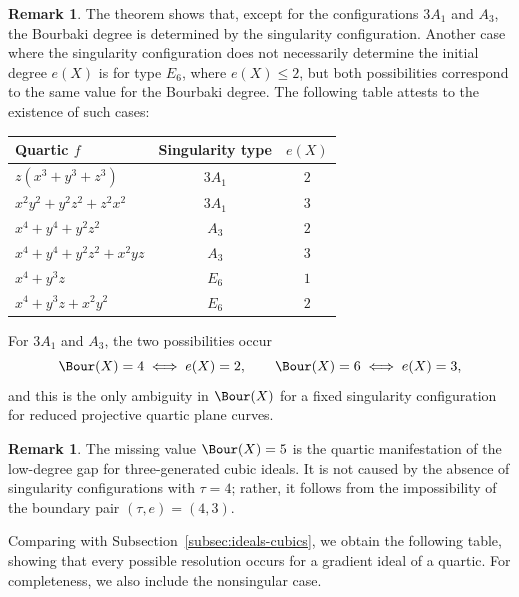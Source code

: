 \documentclass[11pt]{amsart} %
\theoremstyle{definition}
\newtheorem{Remark}[Theorem]{Remark}
\begin{document}
\begin{Remark}\label{rmk:ambiguity-sing-type}
The theorem shows that, except for the configurations \(
3A_1\) and \(A_3\), the Bourbaki degree is determined by the singularity configuration. Another case where the singularity configuration does not necessarily determine the initial degree $e(X)$ is for type $E_6$, where $e(X) \leq 2$, but both possibilities correspond to the same value for the Bourbaki degree. The following table attests to the existence of such cases:
\begin{table}[H]
\centering
\renewcommand{\arraystretch}{1.15}
\begin{tabular}{|l|c|c|}
\hline
Quartic $f$ & Singularity type & $e(X)$ \\ \hline
$z(x^3+y^3+z^3)$
& $3A_1$ & $2$ \\ \hline

$x^2y^2+y^2z^2+z^2x^2$
& $3A_1$ & $3$ \\ \hline

$x^4+y^4+y^2z^2$
& $A_3$ & $2$ \\ \hline

$x^4+y^4+y^2z^2+x^2yz$
& $A_3$ & $3$ \\ \hline

$x^4+y^3z$
& $E_6$ & $1$ \\ \hline

$x^4+y^3z+x^2y^2$
& $E_6$ & $2$ \\ \hline
\end{tabular}
\end{table}
For $3A_1$ and $A_3$, the two possibilities occur
\[
\Bour(X)=4 \iff e(X)=2,
\qquad
\Bour(X)=6 \iff e(X)=3,
\]
and this is the only ambiguity in $\Bour(X)$ for a fixed singularity configuration for reduced projective quartic plane curves.
\end{Remark}

\begin{Remark}
The missing value $\Bour(X)=5$ is the quartic manifestation of the
low-degree gap for three-generated cubic ideals. It is not caused by the
absence of singularity configurations with $\tau=4$; rather, it follows
from the impossibility of the boundary pair $(\tau,e)=(4,3)$.
\end{Remark}

Comparing with Subsection~\ref{subsec:ideals-cubics}, we obtain the
following table, showing that every possible resolution occurs for a
gradient ideal of a quartic. For completeness, we also include the
nonsingular case.
\end{document}
